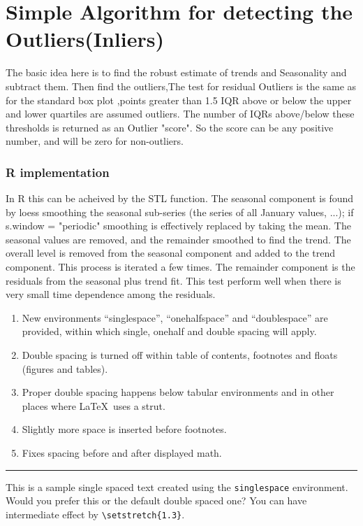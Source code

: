\documentclass[12pt]{iiscthes}
\begin{document}
\bigskip


\newpage
\section{Simple Algorithm for detecting the Outliers(Inliers)}
	The basic idea here is to find the robust estimate of trends and Seasonality
	and subtract them.
	Then find the outliers,The test for residual Outliers is the same as for the standard box plot ,points greater than 1.5 IQR above or below the upper and lower quartiles are assumed outliers.
	The number of IQRs above/below these thresholds is returned as an Outlier "score". So the score can be any positive number, and will be zero for non-outliers.
\subsubsection{R implementation}
    In R this can be acheived by the STL function.
    The seasonal component is found by loess smoothing the seasonal sub-series (the series of all January values, ...); if s.window = "periodic" smoothing is effectively replaced by taking the mean. The seasonal values are removed, and the remainder smoothed to find the trend. The overall level is removed from the seasonal component and added to the trend component. This process is iterated a few times. The remainder component is the residuals from the seasonal plus trend fit.
	This test perform well when there is very small time dependence among the 
	residuals.

\begin{enumerate}
 \item New   environments   ``singlespace'',   ``onehalfspace''    and
``doublespace'' are provided, within which single, onehalf and double
    spacing will apply.
	 \item Double spacing is turned off within  table of contents,
		footnotes and floats (figures and tables).
	 \item Proper double spacing happens below tabular environments and in other
	    places where \LaTeX\ uses a strut.
	 \item Slightly more space is inserted before footnotes.
	 \item Fixes spacing before and after displayed math.
\end{enumerate}

\bigskip
\hrule
\begin{singlespace}
	This is a   sample single    spaced text  created  using   the
\verb|singlespace| environment.  Would you prefer this or
the default double spaced one? You can have intermediate effect by
\verb|\setstretch{1.3}|.
\end{singlespace}
\end{document}
